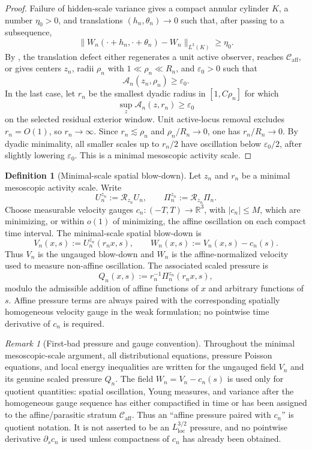 \documentclass[11pt]{amsart}
\numberwithin{equation}{section}
\theoremstyle{plain}
\theoremstyle{definition}
\newtheorem{definition}[theorem]{Definition}
\theoremstyle{remark}
\newtheorem{remark}[theorem]{Remark}
\newcommand{\loc}{\mathrm{loc}}
\newcommand{\calR}{\mathcal R}
\newcommand{\Caff}{\mathcal C_{\mathrm{aff}}}
\begin{document}
\begin{proof}
Failure of hidden-scale variance gives a compact annular cylinder \(K\), a
number \(\eta_0>0\), and translations \((h_n,\theta_n)\to0\) such that, after
passing to a subsequence,
\[
   \|W_n(\cdot+h_n,\cdot+\theta_n)-W_n\|_{L^3(K)}\ge \eta_0 .
\]
By , the translation defect either
regenerates a unit active observer, reaches \(\Caff\), or gives centers
\(z_n\), radii \(\rho_n\) with \(1\ll\rho_n\ll R_n\), and
\(\varepsilon_0>0\) such that
\[
   \mathcal A_n(z_n,\rho_n)\ge\varepsilon_0 .
\]
In the last case, let \(r_n\) be the smallest dyadic radius in
\([1,C\rho_n]\) for which
\[
   \sup_z \mathcal A_n(z,r_n)\ge\varepsilon_0
\]
on the selected residual exterior window.  Unit active-locus removal excludes
\(r_n=O(1)\), so \(r_n\to\infty\).  Since \(r_n\lesssim \rho_n\) and
\(\rho_n/R_n\to0\), one has \(r_n/R_n\to0\).  By dyadic minimality, all
smaller scales up to \(r_n/2\) have oscillation below \(\varepsilon_0/2\), after
slightly lowering \(\varepsilon_0\).  This is a minimal mesoscopic activity scale.
\end{proof}

\begin{definition}[Minimal-scale spatial blow-down]
\label{def:first-bad-spatial-blowdown}
Let \(z_n\) and \(r_n\) be a minimal mesoscopic activity scale.  Write
\[
   U_n^{z_n}:=\calR_{z_n}U_n,\qquad
   \Pi_n^{z_n}:=\calR_{z_n}\Pi_n .
\]
Choose measurable velocity gauges \(c_n:(-T,T)\to\mathbb R^3\), with
\(|c_n|\le M\), which are minimizing, or within \(o(1)\) of minimizing, the
affine oscillation on each compact time interval.  The minimal-scale spatial
blow-down is
\[
   V_n(x,s):=U_n^{z_n}(r_nx,s),
   \qquad
   W_n(x,s):=V_n(x,s)-c_n(s).
\]
Thus \(V_n\) is the ungauged blow-down and \(W_n\) is the affine-normalized
velocity used to measure non-affine oscillation.  The associated scaled
pressure is
\[
   Q_n(x,s):=r_n^{-1}\Pi_n^{z_n}(r_nx,s),
\]
modulo the admissible addition of affine functions of \(x\) and arbitrary
functions of \(s\).  Affine pressure terms are always paired with the
corresponding spatially homogeneous velocity gauge in the weak formulation; no
pointwise time derivative of \(c_n\) is required.
\end{definition}

\begin{remark}[First-bad pressure and gauge convention]
\label{rem:first-bad-pressure-gauge-rule}
Throughout the minimal mesoscopic-scale argument, all distributional equations,
pressure Poisson equations, and local energy inequalities are written for the
ungauged field \(V_n\) and its genuine scaled pressure \(Q_n\).  The field
\(W_n=V_n-c_n(s)\) is used only for quotient quantities: spatial oscillation,
Young measures, and variance after the homogeneous gauge sequence has either
compactified in time or has been assigned to the affine/parasitic stratum
\(\Caff\).  Thus an ``affine pressure paired with \(c_n\)'' is quotient
notation.  It is not asserted to be an \(L^{3/2}_{\loc}\) pressure, and no
pointwise derivative \(\partial_s c_n\) is used unless compactness of \(c_n\)
has already been obtained.
\end{remark}
\end{document}
